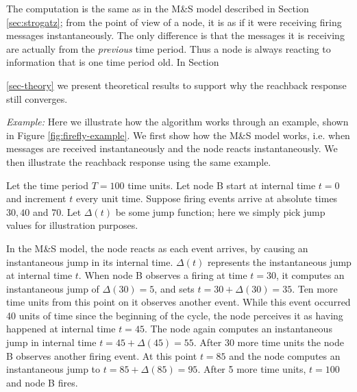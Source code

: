 The computation is the same as in the M\&S model described in Section
\ref{sec:strogatz}; from the point of view of a node, it is as if it
were receiving firing messages instantaneously. The only difference is
that the messages it is receiving are actually from the {\em previous}
time period. Thus a node is always reacting to information that is one
time period old. In Section {\ref{sec-theory} we present theoretical
results to support why the reachback response still converges. 



{\em Example:} Here we illustrate how the algorithm works through an
example, shown in Figure \ref{fig:firefly-example}. We first
show how the M\&S model works, i.e. when messages are received
instantaneously and the node reacts instantaneously. We then
illustrate the reachback response using the same example.

Let the time period $T = 100$ time units. Let node B start at internal
time $t=0$ and increment $t$ every unit time.  Suppose firing events
arrive at absolute times $30, 40$ and $70$. Let $\Delta(t)$ be some
jump function; here we simply pick jump values for illustration
purposes.

In the M\&S model, the node reacts as each event arrives, by causing
an instantaneous jump in its internal time. $\Delta(t)$ represents the
instantaneous jump at internal time $t$. When node B observes a
firing at time $t=30$, it computes an instantaneous jump of
$\Delta(30)=5$, and sets $t = 30+\Delta(30) = 35$. Ten more time units
from this point on it observes another event. While this event
occurred 40 units of time since the beginning of the cycle, the node
perceives it as having happened at internal time $t = 45$. The node
again computes an instantaneous jump in internal time $t=45+\Delta(45)
= 55$. After 30 more time units the node B observes another firing
event. At this point $t=85$ and the node computes an instantaneous
jump to $t=85+\Delta(85)=95$. After 5 more time units, $t=100$ and
node B fires. 

}
